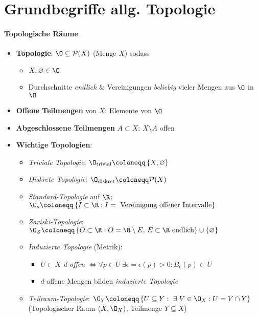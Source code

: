 \section{Grundbegriffe allg. Topologie}

\paragraph{Topologische Räume}
\begin{itemize}
  \item \textbf{Topologie}: \( \O \subseteq \mathcal{P}(X) \) (Menge \( X \)) sodass
  \begin{itemize}
    \item \( X, \varnothing \in \O \)
    \item Durchschnitte \emph{endlich} \& Vereinigungen \emph{beliebig} vieler Mengen aus \( \O \) in \( \O \)
  \end{itemize}
  \item \textbf{Offene Teilmengen} von \( X \): Elemente von \( \O \)
  \item \textbf{Abgeschlossene Teilmengen} \( A \subset X \): \( X \setminus A \) offen
  \item \textbf{Wichtige Topologien}:
  \begin{itemize}
    \item \emph{Triviale Topologie}: \( \O_{\text{trivial}} \coloneqq \left \{ X, \varnothing \right \} \)
    \item \emph{Diskrete Topologie}: \( \O_{\text{diskret}} \coloneqq \mathcal{P}(X) \)
    \item \emph{Standard-Topologie} auf \( \R \): \( \O_s \coloneqq \left \{ I \subset \R : I = \text{ Vereinigung offener Intervalle} \right \} \)
    \item \emph{Zariski-Topologie}: \( \O_Z \coloneqq \left \{ O \subset \R : O = \R \setminus E\text{, } E \subset \R \text{ endlich} \right \} \cup \left \{ \varnothing \right \} \)
    \item \emph{Induzierte Topologie} (Metrik):
    \begin{itemize}
      \item \( U \subset X \) \emph{d-offen} \( \Leftrightarrow \forall p \in U \ \exists \epsilon = \epsilon(p) > 0 : B_\epsilon(p) \subset U \)
      \item \( d \)-offene Mengen bilden \emph{induzierte Topologie}
    \end{itemize}
    \item \emph{Teilraum-Topologie}: \( \O_Y \coloneqq \left \{ U \subseteq Y : \ \exists \ V \in \O_X : U = V \cap Y \right \} \) \\ (Topologischer Raum \( (X, \O_X) \), Teilmenge \( Y \subseteq X \))

\end{itemize}
\end{itemize}
